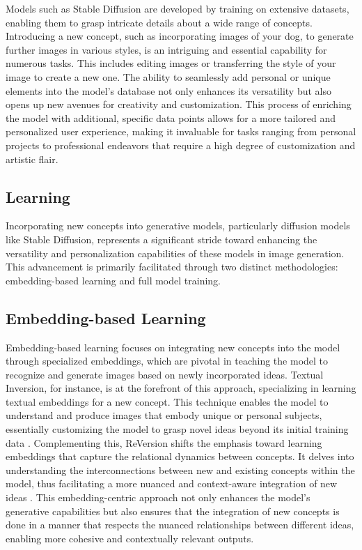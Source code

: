 Models such as Stable Diffusion are developed by training on extensive datasets, enabling them to grasp intricate details about a wide range of concepts. Introducing a new concept, such as incorporating images of your dog, to generate further images in various styles, is an intriguing and essential capability for numerous tasks. This includes editing images or transferring the style of your image to create a new one. The ability to seamlessly add personal or unique elements into the model's database not only enhances its versatility but also opens up new avenues for creativity and customization. This process of enriching the model with additional, specific data points allows for a more tailored and personalized user experience, making it invaluable for tasks ranging from personal projects to professional endeavors that require a high degree of customization and artistic flair.

\subsection{Learning}

Incorporating new concepts into generative models, particularly diffusion models like Stable Diffusion, represents a significant stride toward enhancing the versatility and personalization capabilities of these models in image generation. This advancement is primarily facilitated through two distinct methodologies: embedding-based learning and full model training.

\subsection{Embedding-based Learning}
Embedding-based learning focuses on integrating new concepts into the model through specialized embeddings, which are pivotal in teaching the model to recognize and generate images based on newly incorporated ideas. Textual Inversion, for instance, is at the forefront of this approach, specializing in learning textual embeddings for a new concept. This technique enables the model to understand and produce images that embody unique or personal subjects, essentially customizing the model to grasp novel ideas beyond its initial training data \cite{textualInversion}. Complementing this, ReVersion shifts the emphasis toward learning embeddings that capture the relational dynamics between concepts. It delves into understanding the interconnections between new and existing concepts within the model, thus facilitating a more nuanced and context-aware integration of new ideas \cite{reVersion}. This embedding-centric approach not only enhances the model's generative capabilities but also ensures that the integration of new concepts is done in a manner that respects the nuanced relationships between different ideas, enabling more cohesive and contextually relevant outputs.


